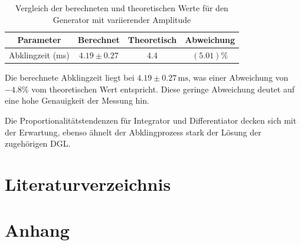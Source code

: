 \documentclass[12pt]{article}
\begin{document}
\begin{table}[H]
  \centering
  \caption{Vergleich der berechneten und theoretischen Werte für den Generator mit variierender Amplitude}
  \begin{tabular}{c | c c | c}
  \toprule
  Parameter & Berechnet & Theoretisch & Abweichung \\
  \midrule
  Abklingzeit (ms) & $4.19 \pm 0.27$ & $4.4$ & $(5.01)\%$\\
  \bottomrule
  \end{tabular}
  \label{tab:gen_var_amp}
\end{table}

Die berechnete Abklingzeit liegt bei $4.19 \pm 0.27\, \mathrm{ms}$, was einer Abweichung von $-4.8\%$ vom theoretischen Wert entspricht. Diese geringe Abweichung deutet auf eine hohe Genauigkeit der Messung hin.

Die Proportionalitätstendenzen für Integrator und Differentiator decken sich mit der Erwartung, ebenso ähnelt der Abklingprozess stark der Lösung der zugehörigen DGL.


\section{Literaturverzeichnis}\label{sec:literaturverzeichnis}
\printbibliography[heading = none]
\newpage

\section{Anhang}\label{sec:anhang}
\end{document}
